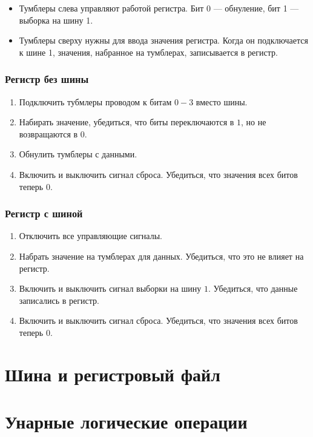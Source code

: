 \documentclass{book}
\begin{document}
\begin{itemize}
  \item Тумблеры слева управляют работой регистра. Бит 0 --- обнуление, бит 1 --- выборка на шину 1.
  \item Тумблеры сверху нужны для ввода значения регистра. Когда он подключается к шине 1,
        значения, набранное на тумблерах, записывается в регистр.
\end{itemize}

\subsubsection{Регистр без шины}

\begin{enumerate}
    \item Подключить тубмлеры проводом к битам $0-3$ вместо шины.
    \item Набирать значение, убедиться, что биты переключаются в $1$, но не возвращаются в $0$.
    \item Обнулить тумблеры с данными.
    \item Включить и выключить сигнал сброса. Убедиться, что значения всех битов теперь $0$.
\end{enumerate}

\subsubsection{Регистр с шиной}

\begin{enumerate}
    \item Отключить все управляющие сигналы.
    \item Набрать значение на тумблерах для данных. Убедиться, что это не влияет на регистр.
    \item Включить и выключить сигнал выборки на шину $1$. Убедиться, что данные записались в регистр.
    \item Включить и выключить сигнал сброса. Убедиться, что значения всех битов теперь $0$.
\end{enumerate}

\section{Шина и регистровый файл}

\section{Унарные логические операции}
\end{document}
